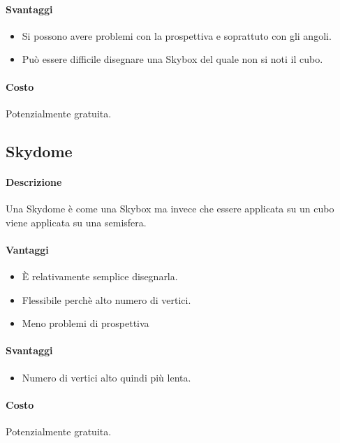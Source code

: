 \documentclass[8pt]{extarticle}
\begin{document}
\begin{multicols}{3}
\paragraph{Svantaggi}
\begin{itemize}
    \item Si possono avere problemi con la prospettiva e soprattuto con gli angoli.
    \item Può essere difficile disegnare una Skybox del quale non si noti il cubo.
\end{itemize}
\paragraph{Costo} Potenzialmente gratuita.
\subsection{Skydome}
\paragraph{Descrizione} 
Una Skydome è come una Skybox ma invece che essere applicata su un cubo viene applicata
su una semisfera.
\paragraph{Vantaggi}
\begin{itemize}
    \item È relativamente semplice disegnarla.
    \item Flessibile perchè alto numero di vertici.
    \item Meno problemi di prospettiva 
\end{itemize}
\paragraph{Svantaggi}
\begin{itemize}
    \item Numero di vertici alto quindi più lenta.
\end{itemize}
\paragraph{Costo} Potenzialmente gratuita.




\end{multicols}
\end{document}
